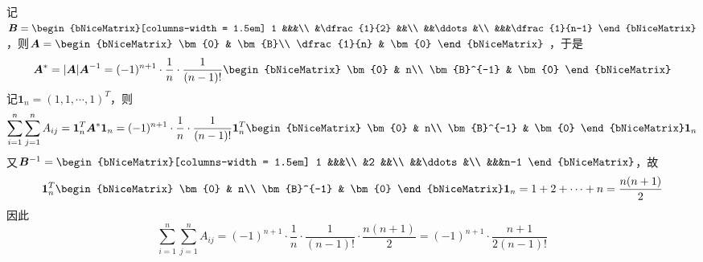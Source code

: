 \documentclass[12pt, a4paper, oneside, UTF8]{ctexbook}
\begin{document}
\begin{solution}
    记$\bm{B} = \begin{bNiceMatrix}[columns-width = 1.5em]
        1 &&&\\
        &\dfrac{1}{2} &&\\
        &&\ddots &\\
        &&&\dfrac{1}{n-1}
    \end{bNiceMatrix}$
    ，则$\bm{A} = \begin{bNiceMatrix}
        \bm{0} & \bm{B}\\
        \dfrac{1}{n} & \bm{0}
    \end{bNiceMatrix}$
    ，于是
    \[
        \bm{A}^*=|\bm{A}|\bm{A}^{-1}=(-1)^{n+1}\cdot\dfrac{1}{n}\cdot\dfrac{1}{(n-1)!}\begin{bNiceMatrix}
        \bm{0} & n\\
        \bm{B}^{-1} & \bm{0}
        \end{bNiceMatrix}
    \]
    记$\bm{1}_{n} = (1,1,\cdots,1)^T$，则
    \[
        \sum_{i=1}^{n}\sum_{j=1}^{n}A_{ij} = \bm{1}_{n}^T\bm{A}^*\bm{1}_{n} = (-1)^{n+1}\cdot\dfrac{1}{n}\cdot\dfrac{1}{(n-1)!}\bm{1}_{n}^T
        \begin{bNiceMatrix}
            \bm{0} & n\\
            \bm{B}^{-1} & \bm{0}
        \end{bNiceMatrix}
        \bm{1}_{n}
    \]
    又$\bm{B}^{-1} = \begin{bNiceMatrix}[columns-width = 1.5em]
        1 &&&\\
        &2 &&\\
        &&\ddots &\\
        &&&n-1
    \end{bNiceMatrix}$，故
    \[
        \bm{1}_{n}^T\begin{bNiceMatrix}
            \bm{0} & n\\
            \bm{B}^{-1} & \bm{0}
        \end{bNiceMatrix}
        \bm{1}_{n} = 1 + 2 + \cdots + n = \dfrac{n(n+1)}{2}
    \]
    因此
    \[
        \sum_{i=1}^{n}\sum_{j=1}^{n}A_{ij} = (-1)^{n+1}\cdot\dfrac{1}{n}\cdot\dfrac{1}{(n-1)!} \cdot \dfrac{n(n+1)}{2} = (-1)^{n+1}\cdot\dfrac{n+1}{2(n-1)!}
    \]
\end{solution}
\end{document}
